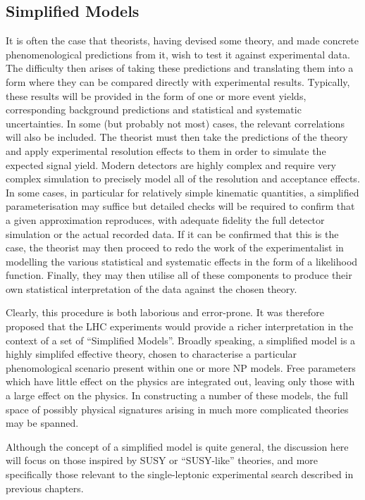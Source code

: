 \subsection{Simplified Models}
\label{sec:sms}
It is often the case that theorists, having devised some theory, and made
concrete phenomenological predictions from it, wish to test it against
experimental data. The difficulty then arises of taking these predictions and
translating them into a form where they can be compared directly with
experimental results. Typically, these results will be provided in the form of
one or more event yields, corresponding background predictions and statistical
and systematic uncertainties. In some (but probably not most) cases, the
relevant correlations will also be included. The theorist must then take the
predictions of the theory and apply experimental resolution effects to them in
order to simulate the expected signal yield. Modern detectors are highly complex
and require very complex simulation to precisely model all of the resolution
and acceptance effects. In some cases, in particular for relatively simple
kinematic quantities, a simplified parameterisation may suffice but detailed
checks will be required to confirm that a given approximation reproduces, with
adequate fidelity the full detector simulation or the actual recorded data. If
it can be confirmed that this is the case, the theorist may then proceed to redo
the work of the experimentalist in modelling the various statistical and
systematic effects in the form of a likelihood function. Finally, they may then
utilise all of these components to produce their own statistical interpretation
of the data against the chosen theory.

Clearly, this procedure is both laborious and error-prone. It was therefore
proposed that the \ac{LHC} experiments would provide a richer interpretation in
the context of a set of ``Simplified Models''. Broadly speaking, a simplified
model is a highly simplifed effective theory, chosen to characterise a
particular phenomological scenario present within one or more \ac{NP}
models. Free parameters which have little effect on the physics are integrated
out, leaving only those with a large effect on the physics. In constructing a
number of these models, the full space of possibly physical signatures arising
in much more complicated theories may be spanned.

Although the concept of a simplified model is quite general, the discussion here
will focus on those inspired by \ac{SUSY} or ``\ac{SUSY}-like'' theories, and
more specifically those relevant to the single-leptonic experimental search
described in previous chapters.

